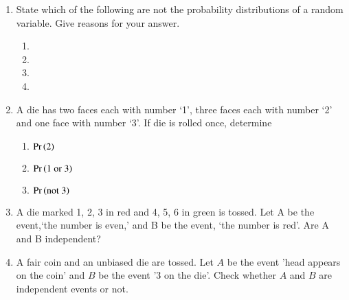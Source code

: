 \begin{enumerate}[label=\thesubsection.\arabic*,ref=\thesubsection.\theenumi]
\item State which of the following are not the probability distributions of a random
variable. Give reasons for your answer.
\begin{multicols}{2}  %
 \begin{enumerate}
		 \setlength{\itemsep}{1ex}
  \item


 \item
	\resizebox{0.95\columnwidth}{!}{%
 
		 }
\item
  
\item
	\resizebox{0.95\columnwidth}{!}{%
  
		 }
\end{enumerate}
\end{multicols}  %
\solution

\item A die has two faces each with number ‘1’, three faces each with number ‘2’ and one face with number ‘3’. If die is rolled once, determine
\begin{enumerate}
\item $\Pr\left(2\right)$
\item $\Pr\left(1 \text{ or } 3\right)$
\item $\Pr\left(\text{not } 3\right)$
\end{enumerate}
		\solution

\item A die marked 1, 2, 3 in red and 4, 5, 6 in green is tossed. Let A be the event,‘the number is even,’ and B be the event, ‘the number is red’. Are A and B independent?
	\\
\solution

\item  A fair coin and an unbiased die are tossed. Let $A$ be the event 'head appears on the coin' and $B$ be the event '3 on the die'. Check whether $A$ and $B$ are independent events or not.
		\label{ncert/12/13/2/4}
\end{enumerate}

